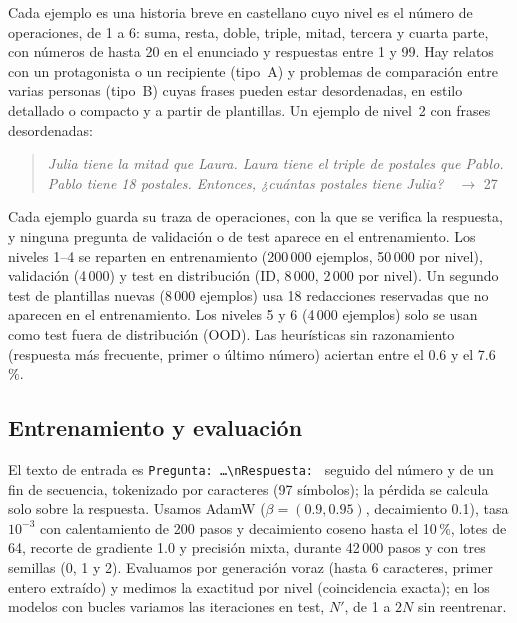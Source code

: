 Cada ejemplo es una historia breve en castellano cuyo nivel es el número de
operaciones, de 1 a 6: suma, resta, doble, triple, mitad, tercera y cuarta
parte, con números de hasta 20 en el enunciado y respuestas entre 1 y 99. Hay
relatos con un protagonista o un recipiente (tipo~A) y problemas de comparación
entre varias personas (tipo~B) cuyas frases pueden estar desordenadas, en
estilo detallado o compacto y a partir de plantillas. Un ejemplo de nivel~2 con frases desordenadas:
\begin{quote}\small
\emph{Julia tiene la mitad que Laura. Laura tiene el triple de postales que Pablo.
Pablo tiene 18 postales. Entonces, ¿cuántas postales tiene Julia?}\ \ $\to$ 27
\end{quote}
Cada ejemplo guarda su traza de operaciones, con la que se verifica la
respuesta, y ninguna pregunta de validación o de test aparece en el
entrenamiento. Los niveles 1--4 se reparten en entrenamiento (200\,000
ejemplos, 50\,000 por nivel), validación (4\,000) y test en distribución
(ID, 8\,000, 2\,000 por nivel). Un segundo test de plantillas nuevas (8\,000
ejemplos) usa 18 redacciones reservadas que no aparecen en el entrenamiento.
Los niveles 5 y 6 (4\,000 ejemplos) solo se usan como test fuera de
distribución (OOD). Las heurísticas sin razonamiento (respuesta más frecuente, primer o último número) aciertan entre el 0.6 y el 7.6\,\%.

\subsection{Entrenamiento y evaluación}
\label{sec:entrenamiento}

El texto de entrada es \texttt{Pregunta: \dots\textbackslash nRespuesta: } seguido
del número y de un fin de secuencia, tokenizado por caracteres (97 símbolos); la
pérdida se calcula solo sobre la respuesta. Usamos AdamW
\citep{loshchilov2019decoupled} ($\beta=(0.9, 0.95)$, decaimiento 0.1), tasa
$10^{-3}$ con calentamiento de 200 pasos y decaimiento coseno hasta el 10\,\%,
lotes de 64, recorte de gradiente 1.0 y precisión mixta, durante 42\,000 pasos y con tres semillas (0, 1 y 2).
Evaluamos por generación voraz (hasta 6 caracteres, primer entero extraído) y
medimos la exactitud por nivel (coincidencia exacta); en los modelos con bucles variamos las
iteraciones en test, $N'$, de 1 a $2N$ sin reentrenar.
